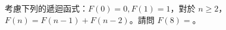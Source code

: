 \ifx\ntpcNinetyThree\undefined[93學年基北區] \fi
\label{ntpc-93-p35} 考慮下列的遞迴函式：$F(0)=0,F(1)=1$，對於 $n\geq{2}$，$F(n)=F(n-1)+F(n-2)$。請問 $F(8)=$\underlineblank{\ref{ntpc-93-p35}}。
